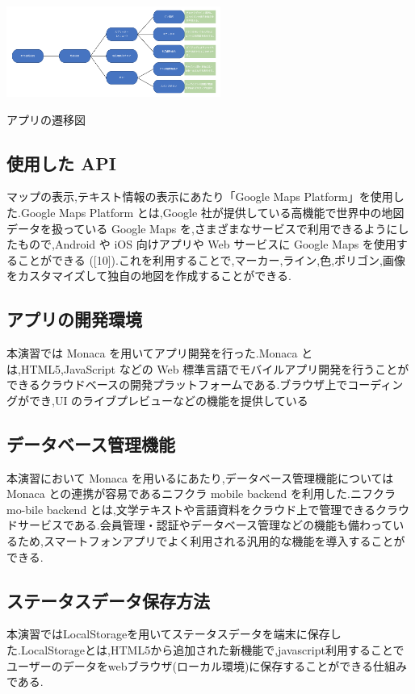 \documentclass[a4paper, twoside]{jarticle}
\makeatletter
\newenvironment{figurehere}
  {\def\@captype{figure}}
  {}
\makeatother
\begin{document}
\begin{multicols}{2}
\begin{figurehere}
\begin{center}
\includegraphics[bb=30 10 700 370,width=7cm]{./image13.png}
\end{center}
\caption{アプリの遷移図}\label{fig:1}
\end{figurehere}

\subsection{使用した API}
マップの表示,テキスト情報の表示にあたり「Google Maps Platform」を使用した.Google Maps Platform とは,Google 社が提供している高機能で世界中の地図データを扱っている Google Maps を,さまざまなサービスで利用できるようにしたもので,Android や iOS 向けアプリや Web サービスに Google Maps を使用することができる ([10]).これを利用することで,マーカー,ライン,色,ポリゴン,画像をカスタマイズして独自の地図を作成することができる.

\subsection{アプリの開発環境}
本演習では Monaca を用いてアプリ開発を行った.Monaca とは,HTML5,JavaScript などの Web 標準言語でモバイルアプリ開発を行うことができるクラウドベースの開発プラットフォームである.ブラウザ上でコーディングができ,UI のライブプレビューなどの機能を提供している

\subsection{データベース管理機能}
本演習において Monaca を用いるにあたり,データベース管理機能については Monaca との連携が容易であるニフクラ mobile backend を利用した.ニフクラ mo-bile backend とは,文学テキストや言語資料をクラウド上で管理できるクラウドサービスである.会員管理・認証やデータベース管理などの機能も備わっているため,スマートフォンアプリでよく利用される汎用的な機能を導入することができる.

\subsection{ステータスデータ保存方法}
本演習ではLocalStorageを用いてステータスデータを端末に保存した.LocalStorageとは,HTML5から追加された新機能で,javascript利用することでユーザーのデータをwebブラウザ(ローカル環境)に保存することができる仕組みである.


\end{multicols}
\end{document}
